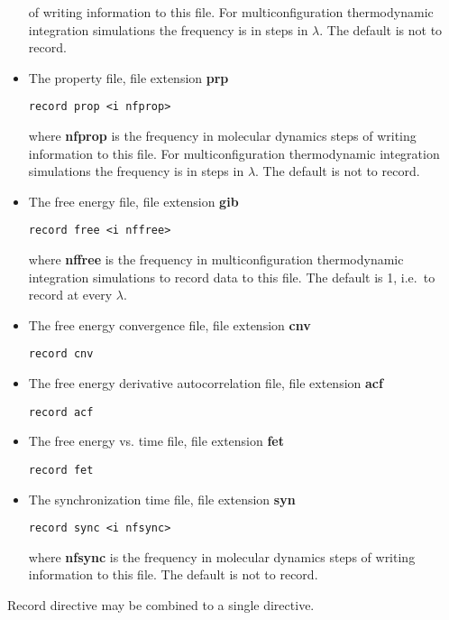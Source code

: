 \begin{itemize}
of writing information to this file. For multiconfiguration
thermodynamic integration simulations the frequency is in
steps in $\lambda$. The default is not to record.
\item
The property file, file extension {\bf prp}
\begin{verbatim}
record prop <i nfprop>
\end{verbatim}
where {\bf nfprop} is the frequency in molecular dynamics steps
of writing information to this file. For multiconfiguration
thermodynamic integration simulations the frequency is in
steps in $\lambda$. The default is not to record.
\item
The free energy file, file extension {\bf gib}
\begin{verbatim}
record free <i nffree>
\end{verbatim}
where {\bf nffree} is the frequency in multiconfiguration
thermodynamic integration simulations to record data to this file.
The default is 1, i.e.\ to record at every $\lambda$.
\item
The free energy convergence file, file extension {\bf cnv}
\begin{verbatim}
record cnv
\end{verbatim}
\item
The free energy derivative autocorrelation file, file extension {\bf acf}
\begin{verbatim}
record acf
\end{verbatim}
\item
The free energy vs. time file, file extension {\bf fet}
\begin{verbatim}
record fet
\end{verbatim}
\item
The synchronization time file, file extension {\bf syn}
\begin{verbatim}
record sync <i nfsync>
\end{verbatim}
where {\bf nfsync} is the frequency in molecular dynamics steps
of writing information to this file. The default is not to record.
\end{itemize}
Record directive may be combined to a single directive.

